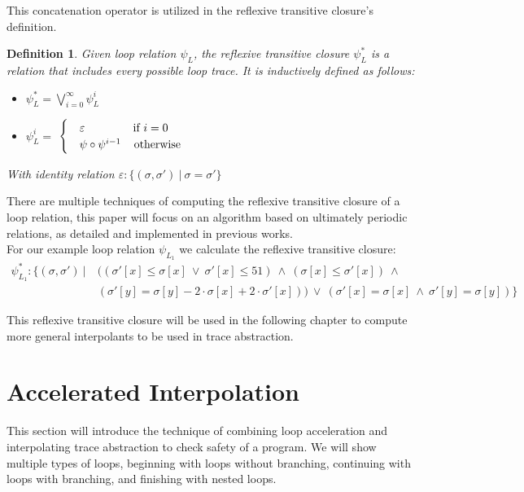 \documentclass{article}
\newcounter{example}[section]
\newtheorem{mydef}{Definition}
\newcommand\mycom[1]{}
\newcommand\mycom[1]{#1}
\newcommand{\ts}[1]{\mycom{\todo[color=green!40,inline]{\small TS: #1}}}
\begin{document}
This concatenation operator is utilized in the reflexive transitive closure's definition.

\begin{mydef}
    Given loop relation $\psi_L$, the reflexive transitive closure $\psi_L^*$ is a relation that includes every possible loop trace. It is inductively defined as follows:
    \begin{itemize}
        \item $\psi^*_L = \bigvee_{i=0}^\infty \psi^i_L$
        \item $\psi^i_L = $
        $\begin{cases}
            & \varepsilon \hspace{1.5cm} \text{if}\ i = 0 \\
            & \psi \circ \psi^{i - 1} \hspace{0.4cm}\text{otherwise}
        \end{cases}$
    \end{itemize}
With identity relation $\varepsilon: \{(\sigma, \sigma')\ |\ \sigma = \sigma'\}$
\end{mydef}
\ts{In the definition, only define reflexive transitive closure, and \emph{afterwards} write what it means here (...every possible loop trace...).}
There are multiple techniques of computing the reflexive transitive closure of a loop relation, this paper will focus on an algorithm based on ultimately periodic relations, as detailed and implemented in previous works\cite{JillThesis}. \\

For our example loop relation  	$\psi_{L_1}$ we calculate the reflexive transitive closure:
\begin{align*}
    \psi^*_{L_1}: \{(\sigma, \sigma') \  |\ &((\sigma'[x] \leq \sigma[x]\ \lor\ \sigma'[x] \leq 51)\ \land\ (\sigma[x] \leq \sigma'[x])\ \land\ \\ & (\sigma'[y] = \sigma[y] - 2 \cdot \sigma[x] + 2\cdot \sigma'[x]))\ \lor\ (\sigma'[x] = \sigma[x]\ \land\ \sigma'[y] = \sigma[y]) \}
\end{align*}

This reflexive transitive closure will be used in the following chapter to compute more general interpolants to be used in trace abstraction.

\section{Accelerated Interpolation}
This section will introduce the technique of combining loop acceleration and interpolating trace abstraction to check safety of a program. We will show multiple types of loops, beginning with loops without branching, continuing with loops with branching, and finishing with nested loops. \\
\end{document}
